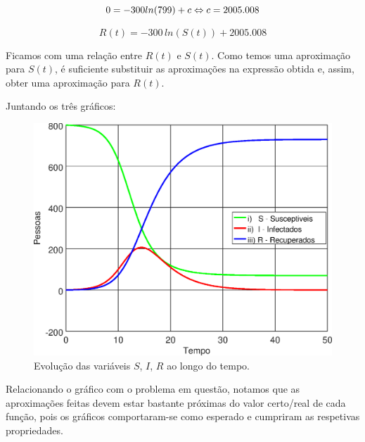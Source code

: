\documentclass[portuguese, a4paper]{article}
\newcommand\eq[0]{\Leftrightarrow}
\begin{document}
		\begin{equation}
			0 = -300 ln(799) + c \eq \\
			c = 2005.008 \\
		\end{equation}

		\begin{equation}
			R(t) = -300\, ln(S(t)) + 2005.008
		\end{equation}

		\par
		Ficamos com uma relação entre $R(t)$ e $S(t)$. Como temos uma
		aproximação para $S(t)$, é suficiente substituir as aproximações na
		expressão obtida e, assim, obter uma aproximação para $R(t)$.

		\par
		Juntando os três gráficos:

		\begin{figure}[H]
			\centering
			\includegraphics[width=0.70\linewidth]{IIIc_fitted}
			\captionsetup{width=0.70\linewidth}
			\caption[Caption]{Evolução das variáveis $S$, $I$, $R$ ao longo do
			tempo.
			\footnotemark}
		\end{figure}

		\par
		Relacionando o gráfico com o problema em questão, notamos que as aproximações feitas devem estar
		bastante próximas do valor certo/real de cada função, pois os gráficos comportaram-se como esperado e cumpriram as respetivas propriedades.
\end{document}
